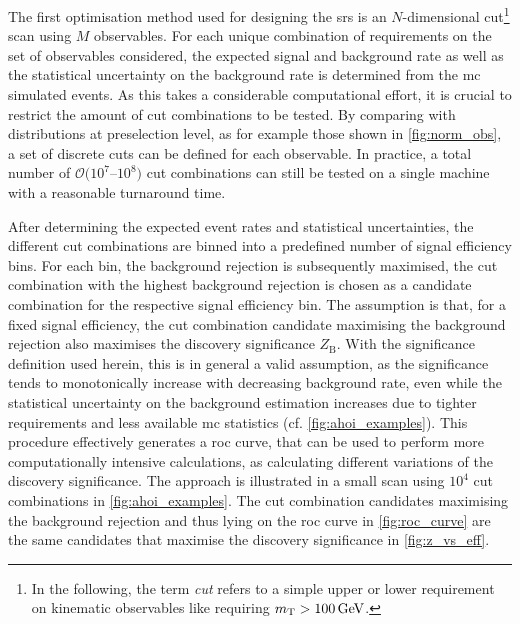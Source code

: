 The first optimisation method used for designing the \glspl{sr} is an $N$-dimensional cut\footnote{In the following, the term \textit{cut} refers to a simple upper or lower requirement on kinematic observables like \eg requiring $\mt>\SI{100}{\GeV}$.} scan using $M$ observables.
For each unique combination of requirements on the set of observables considered, the expected signal and background rate as well as the statistical uncertainty on the background rate is determined from the \gls{mc} simulated events.
As this takes a considerable computational effort, it is crucial to restrict the amount of cut combinations to be tested. By comparing with distributions at preselection level, as for example those shown in \cref{fig:norm_obs}, a set of discrete cuts can be defined for each observable.
In practice, a total number of \mbox{$\mathcal{O}(10^7$--$10^8)$} cut combinations can still be tested on a single machine with a reasonable turnaround time. 

After determining the expected event rates and statistical uncertainties, the different cut combinations are binned into a predefined number of signal efficiency bins.
For each bin, the background rejection is subsequently maximised, \ie the cut combination with the highest background rejection is chosen as a candidate combination for the respective signal efficiency bin.
The assumption is that, for a fixed signal efficiency, the cut combination candidate maximising the background rejection also maximises the discovery significance $Z_\mathrm{B}$.
With the significance definition used herein, this is in general a valid assumption, as the significance tends to monotonically increase with decreasing background rate, even while the statistical uncertainty on the background estimation increases due to tighter requirements and less available \gls{mc} statistics (cf. \cref{fig:ahoi_examples}).
This procedure effectively generates a \gls{roc} curve, that can be used to perform more computationally intensive calculations, as \eg calculating different variations of the discovery significance.
The approach is illustrated in a small scan using $10^4$ cut combinations in \cref{fig:ahoi_examples}.
The cut combination candidates maximising the background rejection and thus lying on the \gls{roc} curve in \cref{fig:roc_curve} are the same candidates that maximise the discovery significance in \cref{fig:z_vs_eff}.

